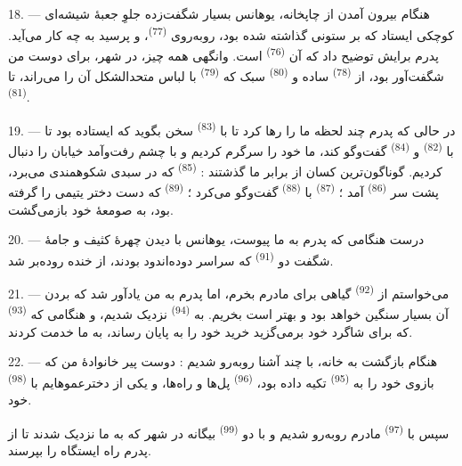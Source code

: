 \VUsaut{3.0mm}

18. --- هنگام بیرون آمدن از چاپخانه، یوهانس بسیار شگفت‌زده جلوِ جعبهٔ
شیشه‌ای کوچکی ایستاد که بر ستونی گذاشته شده بود، روبه‌روی
 \textsuperscript{(77)}، و پرسید به چه کار می‌آید. پدرم
برایش توضیح داد که آن  \textsuperscript{(76)}
است. وانگهی همه چیز، در شهر، برای دوست من شگفت‌آور بود، از
 \textsuperscript{(78)} ساده و  \textsuperscript{(80)} سبک که 
\textsuperscript{(79)} با لباس متحدالشکل آن را می‌راند، تا
 \textsuperscript{(81)}.

19. --- در حالی که پدرم چند لحظه ما را رها کرد تا با  \textsuperscript{(83)} سخن بگوید که ایستاده بود تا با
 \textsuperscript{(82)} و 
\textsuperscript{(84)} گفت‌وگو کند، ما خود را سرگرم کردیم و با چشم
رفت‌وآمد خیابان را دنبال کردیم. گوناگون‌ترین کسان از برابر ما گذشتند :
 \textsuperscript{(85)} که در سبدی
 شکوهمندی می‌برد، پشت سر 
\textsuperscript{(86)} آمد ؛  \textsuperscript{(87)}
با  \textsuperscript{(88)} گفت‌وگو می‌کرد ؛
 \textsuperscript{(89)} که دست دختر یتیمی را گرفته
بود، به صومعهٔ خود بازمی‌گشت.

\VUsaut{3.0mm}

20. --- درست هنگامی که پدرم به ما پیوست، یوهانس با دیدن چهرهٔ کثیف و
جامهٔ شگفت دو  \textsuperscript{(91)} که سراسر
دوده‌اندود بودند، از خنده روده‌بر شد.

21. --- می‌خواستم از  \textsuperscript{(92)} گیاهی برای
مادرم بخرم، اما پدرم به من یادآور شد که بردن آن بسیار سنگین خواهد بود
و بهتر است  بخریم. به 
\textsuperscript{(94)} نزدیک شدیم، و هنگامی که 
\textsuperscript{(93)} که برای شاگرد خود برمی‌گزید خرید خود را به پایان
رساند، به ما خدمت کردند.

22. --- هنگام بازگشت به خانه، با چند آشنا روبه‌رو شدیم : دوست پیر
خانوادهٔ من که بازوی خود را به 
\textsuperscript{(95)} تکیه داده بود، 
\textsuperscript{(96)} پل‌ها و راه‌ها، و یکی از دخترعموهایم با
 \textsuperscript{(98)} خود.

سپس با  \textsuperscript{(97)} مادرم روبه‌رو شدیم و با
دو  \textsuperscript{(99)} بیگانه در شهر که به ما نزدیک
شدند تا از پدرم راه ایستگاه را بپرسند.

\VUsaut{6.0mm}
\VUfilet{22mm}
